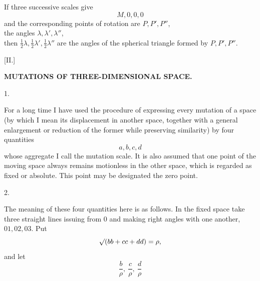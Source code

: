 \par
{}%
If three successive scales give
\[
M,0,0,0
\]
and the corresponding points of rotation are $P,P',P''$,\\
\hspace*{5em}the angles $\lambda,\lambda',\lambda''$,\\
then $\tfrac12\lambda,\tfrac12\lambda',\tfrac12\lambda''$ are the angles of the spherical triangle formed by $P,P',P''$.

\begin{center}[II.]\end{center}
\begin{center}\bfseries MUTATIONS OF THREE-DIMENSIONAL SPACE.\end{center}
\begin{center}1.\end{center}

For a long time I have used the procedure of expressing every mutation of a space (by which I mean its displacement in another space, together with a general enlargement or reduction of the former while preserving similarity) by four quantities
\[
a,b,c,d
\]
whose aggregate I call the mutation scale. It is also assumed that one point of the moving space always remains motionless in the other space, which is regarded as fixed or absolute. This point may be designated the zero point.

\begin{center}2.\end{center}

The meaning of these four quantities here is as follows. In the fixed space take three straight lines issuing from $0$ and making right angles with one another, $01,02,03$. Put
\[
\mathord{\surd}(bb+cc+dd)=\rho,
\]
and let
\[
\frac b\rho,\ \frac c\rho,\ \frac d\rho
\]
